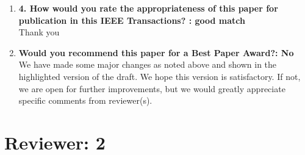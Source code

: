 \documentclass[11pt]{article}
\begin{document}
\begin{enumerate}
\item\textbf{4. How would you rate the appropriateness of this paper for publication in this IEEE Transactions? : good match}\\
Thank you

\item\textbf{Would you recommend this paper for a Best Paper Award?: No}\\
We have made some major changes as noted above and shown in the highlighted version of the draft. We hope this version is satisfactory. If not, we are open for further improvements, but we would greatly appreciate specific comments from reviewer(s).
\end{enumerate}

\section*{Reviewer: 2}
\end{document}
